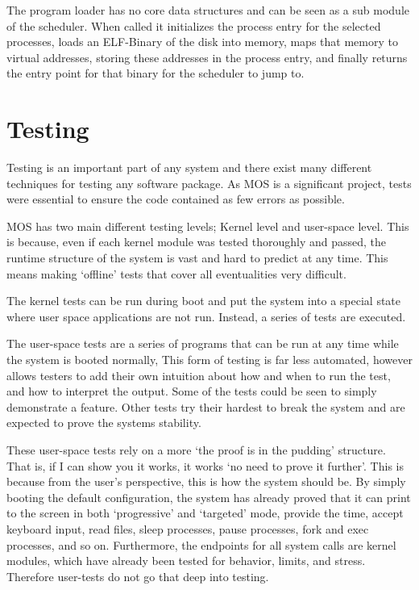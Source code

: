 \documentclass[a4paper]{report}
\begin{document}
The program loader has no core data structures and can be seen as a sub module of the scheduler. When called it initializes the process entry for the selected processes, loads an ELF-Binary of the disk into memory, maps that memory to virtual addresses, storing these addresses in the process entry, and finally returns the entry point for that binary for the scheduler to jump to.








\chapter{Testing}

Testing is an important part of any system and there exist many different techniques for testing any software package. As MOS is a significant project, tests were essential to ensure the code contained as few errors as possible. 

MOS has two main different testing levels; Kernel level and user-space level. This is because, even if each kernel module was tested thoroughly and passed, the runtime structure of the system is vast and hard to predict at any time. This means making `offline' tests that cover all eventualities very difficult.

The kernel tests can be run during boot and put the system into a special state where user space applications are not run. Instead, a series of tests are executed.

The user-space tests are a series of programs that can be run at any time while the system is booted normally, This form of testing is far less automated, however allows testers to add their own intuition about how and when to run the test, and how to interpret the output. Some of the tests could be seen to simply demonstrate a feature. Other tests try their hardest to break the system and are expected to prove the systems stability.

These user-space tests rely on a more `the proof is in the pudding' structure. That is, if I can show you it works, it works `no need to prove it further'. This is because from the user's perspective, this is how the system should be. By simply booting the default configuration, the system has already proved that it can print to the screen in both `progressive' and `targeted' mode, provide the time, accept keyboard input, read files, sleep processes, pause processes, fork and exec processes, and so on. Furthermore, the endpoints for all system calls are kernel modules, which have already been tested for behavior, limits, and stress. Therefore user-tests do not go that deep into testing. 
\end{document}
